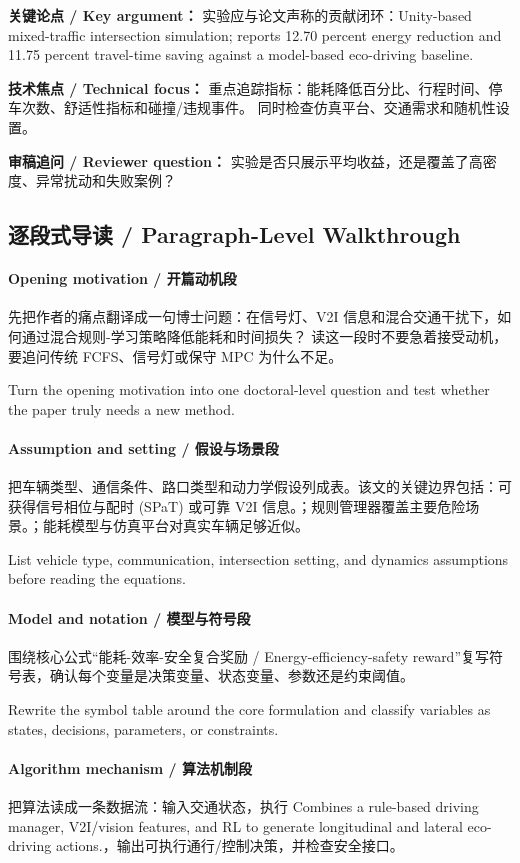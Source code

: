 \documentclass[UTF8,a4paper,11pt,fontset=fandol]{ctexart}
\begin{document}
\textbf{关键论点 / Key argument：} 实验应与论文声称的贡献闭环：Unity-based mixed-traffic intersection simulation; reports 12.70 percent energy reduction and 11.75 percent travel-time saving against a model-based eco-driving baseline.

\textbf{技术焦点 / Technical focus：} 重点追踪指标：能耗降低百分比、行程时间、停车次数、舒适性指标和碰撞/违规事件。 同时检查仿真平台、交通需求和随机性设置。

\textbf{审稿追问 / Reviewer question：} 实验是否只展示平均收益，还是覆盖了高密度、异常扰动和失败案例？


\subsection{逐段式导读 / Paragraph-Level Walkthrough}
\paragraph{Opening motivation / 开篇动机段}先把作者的痛点翻译成一句博士问题：在信号灯、V2I 信息和混合交通干扰下，如何通过混合规则-学习策略降低能耗和时间损失？ 读这一段时不要急着接受动机，要追问传统 FCFS、信号灯或保守 MPC 为什么不足。

Turn the opening motivation into one doctoral-level question and test whether the paper truly needs a new method.

\paragraph{Assumption and setting / 假设与场景段}把车辆类型、通信条件、路口类型和动力学假设列成表。该文的关键边界包括：可获得信号相位与配时 (SPaT) 或可靠 V2I 信息。；规则管理器覆盖主要危险场景。；能耗模型与仿真平台对真实车辆足够近似。

List vehicle type, communication, intersection setting, and dynamics assumptions before reading the equations.

\paragraph{Model and notation / 模型与符号段}围绕核心公式“能耗-效率-安全复合奖励 / Energy-efficiency-safety reward”复写符号表，确认每个变量是决策变量、状态变量、参数还是约束阈值。

Rewrite the symbol table around the core formulation and classify variables as states, decisions, parameters, or constraints.

\paragraph{Algorithm mechanism / 算法机制段}把算法读成一条数据流：输入交通状态，执行 Combines a rule-based driving manager, V2I/vision features, and RL to generate longitudinal and lateral eco-driving actions.，输出可执行通行/控制决策，并检查安全接口。
\end{document}
